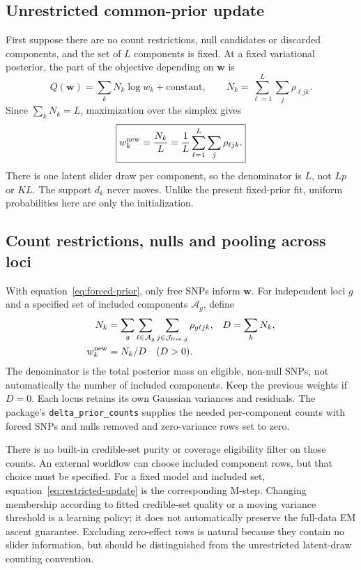 \documentclass[11pt]{article}
\begin{document}
\subsection{Unrestricted common-prior update}
First suppose there are no count restrictions, null candidates or
discarded components, and the set of $L$ components is fixed.
At a fixed variational posterior, the part of the objective depending on
$\mathbf w$ is
\begin{equation}
 Q(\mathbf w)=\sum_kN_k\log w_k+\text{constant},\qquad
 N_k=\sum_{\ell=1}^L\sum_j\rho_{\ell jk}.
 \label{eq:Q}
\end{equation}
Since $\sum_kN_k=L$, maximization over the simplex gives
\begin{equation}
 \boxed{w_k^{\rm new}=\frac{N_k}{L}
       =\frac1L\sum_{\ell=1}^L\sum_j\rho_{\ell jk}.}
 \label{eq:wupdate}
\end{equation}
There is one latent slider draw per component, so the denominator is $L$,
not $Lp$ or $KL$. The support $d_k$ never moves. Unlike the present
fixed-prior fit, uniform probabilities here are only the initialization.

\subsection{Count restrictions, nulls and pooling across loci}
With equation~\eqref{eq:forced-prior}, only free SNPs inform $\mathbf w$.
For independent loci $g$ and a specified set of included components
$\mathcal A_g$, define
\begin{align}
 N_k&=\sum_g\sum_{\ell\in\mathcal A_g}
          \sum_{j\in\mathcal J_{{\rm free},g}}\rho_{g\ell jk},&
 D&=\sum_kN_k,\nonumber\\
 w_k^{\rm new}&=N_k/D\quad(D>0).
 \label{eq:restricted-update}
\end{align}
The denominator is the total posterior mass on eligible, non-null SNPs,
not automatically the number of included components. Keep the previous
weights if $D=0$. Each locus retains its own Gaussian variances and
residuals. The package's \texttt{delta\_prior\_counts} supplies the needed
per-component counts with forced SNPs and nulls removed and zero-variance
rows set to zero.

There is no built-in credible-set purity or coverage eligibility filter
on those counts. An external workflow can choose included component rows,
but that choice must be specified. For a fixed model and included set,
equation~\eqref{eq:restricted-update} is the corresponding M-step.
Changing membership according to fitted credible-set quality or a moving
variance threshold is a learning policy; it does not automatically
preserve the full-data EM ascent guarantee. Excluding zero-effect rows
is natural because they contain no slider information, but should be
distinguished from the unrestricted latent-draw counting convention.
\end{document}
